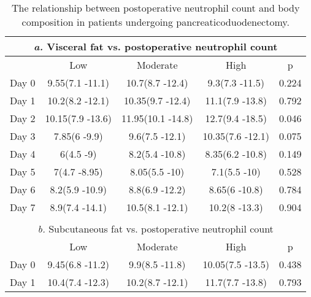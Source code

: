 \begin{table}[p]
	\caption{The relationship  between postoperative neutrophil count and body composition in patients undergoing pancreaticoduodenectomy. }
	\label{table:sirs_bodycomp_neut}
	\centering
	\renewcommand{\arraystretch}{1.2} %
	\setlength{\tabcolsep}{9pt} %
	
	\begin{tabular}{|l c c c c |}
		        \multicolumn{5}{c}{\textit{a.} Visceral fat vs. postoperative neutrophil count}         \\ \hline
		      & Low              & Moderate          & High              & p                            \\
		Day 0 & 9.55(7.1 -11.1)  & 10.7(8.7 -12.4)   & 9.3(7.3 -11.5)    & 0.224                        \\
		Day 1 & 10.2(8.2 -12.1)  & 10.35(9.7 -12.4)  & 11.1(7.9 -13.8)   & 0.792                        \\
		Day 2 & 10.15(7.9 -13.6) & 11.95(10.1 -14.8) & 12.7(9.4 -18.5)   & 0.046                        \\
		Day 3 & 7.85(6 -9.9)     & 9.6(7.5 -12.1)    & 10.35(7.6 -12.1)  & 0.075                        \\
		Day 4 & 6(4.5 -9)        & 8.2(5.4 -10.8)    & 8.35(6.2 -10.8)   & 0.149                        \\
		Day 5 & 7(4.7 -8.95)     & 8.05(5.5 -10)     & 7.1(5.5 -10)      & 0.528                        \\
		Day 6 & 8.2(5.9 -10.9)   & 8.8(6.9 -12.2)    & 8.65(6 -10.8)     & 0.784                        \\
		Day 7 & 8.9(7.4 -14.1)   & 10.5(8.1 -12.1)   & 10.2(8 -13.3)     & 0.904                        \\ \hline
		                                     \multicolumn{5}{c}{}                                       \\
		      \multicolumn{5}{c}{\textit{b.} Subcutaneous fat vs. postoperative neutrophil count}       \\ \hline
		      & Low              & Moderate          & High              & p                            \\
		Day 0 & 9.45(6.8 -11.2)  & 9.9(8.5 -11.8)    & 10.05(7.5 -13.5)  & 0.438                        \\
		Day 1 & 10.4(7.4 -12.3)  & 10.2(8.7 -12.1)   & 11.7(7.7 -13.8)   & 0.793                        \\

\end{tabular}
\end{table}
